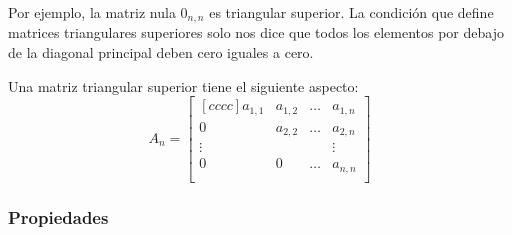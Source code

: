 \documentclass[12pt, fleqn]{report}                             %
\theoremstyle{break}                                            %
\begin{document}
            Por ejemplo, la matriz nula $0_{n,n}$ es triangular superior. La condición que define
            matrices triangulares superiores solo nos dice que todos los elementos por debajo de la
            diagonal principal deben cero iguales a cero.

            Una matriz triangular superior tiene el siguiente aspecto:
            \begin{equation*}
                A_n =
                \begin{bmatrix}[cccc]
                    a_{1,1} & a_{1, 2}  & \dots & a_{1, n}  \\
                    0       & a_{2,2}   & \dots & a_{2, n}  \\
                    \vdots  &           &       & \vdots    \\
                    0       & 0         & \dots & a_{n,n}   \\
                \end{bmatrix}
            \end{equation*}

            \clearpage
            \subsubsection{Propiedades}
\end{document}

